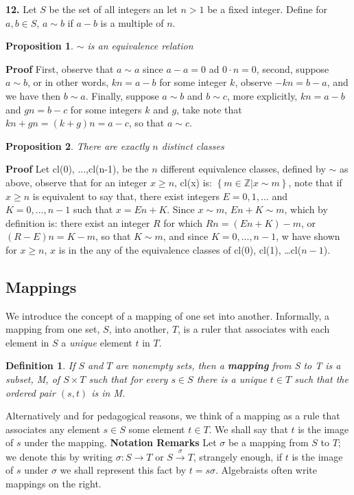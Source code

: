 \documentclass[11pt,a4paper]{article}
\newtheorem{define}{Definition}
\newtheorem{claim}{Proposition}
\begin{document}
\textbf{12.} Let $S$ be the set of all integers an let $ n >1$ be a fixed integer. Define for $a,b \in S$, $a \sim b$ if $ a - b$ is a multiple of $n$. 
\begin{claim}
	$\sim$ is an equivalence relation
\end{claim}
\textbf{Proof}
First, observe that $ a \sim a$ since $ a - a = 0$ ad $0 \cdot n = 0$, second, suppose $ a \sim b$, or in other words, $ kn = a -b$ for some integer $k$, observe $ -kn = b - a$, and we have then $ b \sim a$. Finally, suppose $ a \sim b$ and $b \sim c$, more explicitly, $kn = a -b$ and $gn = b -c$ for some integers $k$ and $g$, take note that $kn + gn = (k +g)n = a -c$, so that $ a \sim c$. \par 
\begin{claim}
	There are exactly $n$ distinct classes
\end{claim}
\textbf{Proof}
Let cl(0), ...,cl(n-1), be the $n$ different equivalence classes, defined by $ \sim $ as above, observe that for an integer $ x \geq n $, cl(x) is: $ \left\lbrace m \in \mathbb{Z} \vert x \sim m \right\rbrace $, note that  if $ x \geq n $ is equivalent to say that, there exist integers  $ E = {0,1,...} $ and $K = {0,...,n-1} $ such that $ x = En + K $. Since $ x \sim m $, $ En + K \sim m$, which by definition is: there exist an integer $R$ for which $ Rn= (En + K) - m$, or $ (R - E)n = K - m $, so that $ K \sim m$, and since $K = {0,...,n-1}$, w have shown for $ x \geq n $, $x$ is in the any of the equivalence classes of cl(0), cl(1), \ldots cl($n-1$).
\subsection{Mappings}
We introduce the concept of a mapping of one set into another. Informally, a mapping from one set, $S$, into another, $T$, is a ruler that associates with each element in $S$ a \emph{unique} element $t$ in $T$.
\begin{define}
	If $S$ and $T$ are nonempty sets, then a \textbf{mapping} from S to T is a subset, M, of $ S \times T$ such that for every $ s \in S$ there is a unique $t \in T$ such that the ordered pair $ (s,t)$ is in M.	
\end{define}
Alternatively and for pedagogical reasons, we think of a mapping as a rule that associates any element $s \in S$ some element $ t \in T$. We shall say that $t$ is the image of $s$ under the mapping.
\textbf{Notation Remarks} Let $ \sigma $ be a mapping from $S$ to $T$; we denote this by writing $\sigma : S \rightarrow T$ or $ S \xrightarrow{\sigma} T$, strangely enough, if $t$ is the image of $s$ under $\sigma$ we shall represent this fact by $ t = s\sigma $. Algebraists often write mappings on the right. 

	
\end{document}
